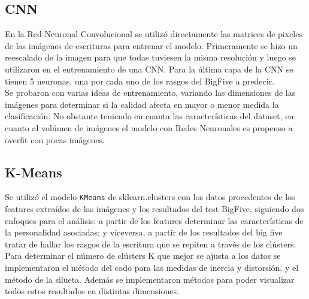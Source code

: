 \documentclass[10pt, a4paper]{article}
\begin{document}
        \subsection{CNN}
            En la Red Neuronal Convolucional se utiliz\'o directamente las matrices de pixeles de las im\'agenes de escrituras para entrenar el modelo. 
            Primeramente se hizo un reescalado de la imagen para que todas tuviesen la misma resoluci\'on y luego se utilizaron en el entrenamiento de una CNN.
            Para la \'ultima capa de la CNN se tienen 5 neuronas, una por cada uno de los rasgos del BigFive a predecir.\\
            
            Se probaron con varias ideas de entrenamiento, variando las dimensiones de las im\'agenes para determinar si la calidad afecta en mayor o menor medida la clasificaci\'on. No obstante teniendo en cuanta las caracter\'isticas del dataset, en cuanto al vol\'umen de im\'agenes el modelo con Redes Neuronales es propenso 
            a overfit con pocas im\'agenes. 

        \subsection{K-Means}
        	Se utiliz\'o el modelo \texttt{KMeans} de sklearn.clusters con los datos procedentes de los features extra\'idos de las im\'agenes y los resultados del test BigFive, siguiendo dos enfoques para el an\'alisis: a partir de los features determinar las caracter\'isticas de la personalidad asociadas; y viceversa, a partir de los resultados del big five tratar de hallar los rasgos de la escritura que se repiten a trav\'es de los cl\'usters. Para determinar el n\'umero de cl\'usters K que mejor se ajusta a los datos se implementaron el m\'etodo del codo para las medidas de inercia y distorsi\'on, y el m\'etodo de la silueta. Adem\'as se implementaron m\'etodos para poder visualizar todos estos resultados en distintas dimensiones. 
        
\end{document}
